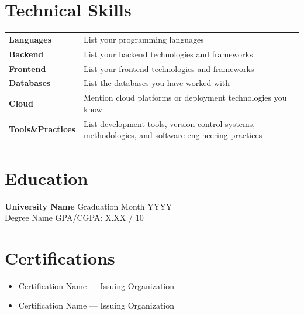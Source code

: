 \documentclass[a4paper,10pt]{article}
\begin{document}
\section*{Technical Skills}

\vspace{-2mm}

\begin{tabular}{p{3cm} p{12cm}}
\textbf{Languages} & List your programming languages \\

\textbf{Backend} & List your backend technologies and frameworks \\

\textbf{Frontend} & List your frontend technologies and frameworks \\

\textbf{Databases} & List the databases you have worked with \\

\textbf{Cloud} & Mention cloud platforms or deployment technologies you know \\

\textbf{Tools\&Practices} & List development tools, version control systems, methodologies, and software engineering practices \\
\end{tabular}

\vspace{-2mm}

\section*{Education}

\textbf{University Name} \hfill Graduation Month YYYY\\

Degree Name \hfill GPA/CGPA: X.XX / 10

\vspace{-2mm}

\section*{Certifications}

\begin{itemize}
    \item Certification Name --- Issuing Organization
    
    \item Certification Name --- Issuing Organization
\end{itemize}
\end{document}
